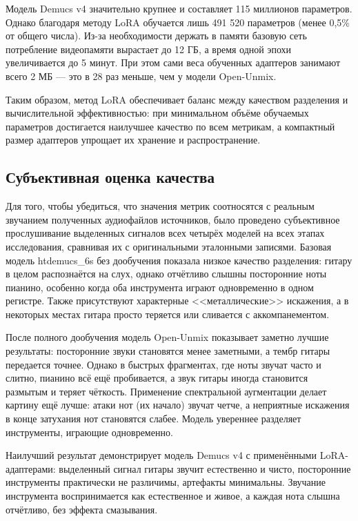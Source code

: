 \documentclass[14pt]{extarticle}
\begin{document}
Модель Demucs v4 значительно крупнее и составляет 115 миллионов параметров. Однако благодаря методу LoRA обучается лишь 
491 520 параметров (менее 0,5\% от общего числа). Из-за необходимости держать в памяти базовую сеть потребление видеопамяти 
вырастает до 12 ГБ, а время одной эпохи увеличивается до 5 минут. При этом сами веса обученных адаптеров занимают всего 2 МБ --- 
это в 28 раз меньше, чем у модели Open-Unmix.

Таким образом, метод LoRA обеспечивает баланс между качеством разделения и вычислительной эффективностью: при 
минимальном объёме обучаемых параметров достигается наилучшее качество по всем метрикам, а компактный размер адаптеров 
упрощает их хранение и распространение.

\subsection{Субъективная оценка качества}

Для того, чтобы убедиться, что значения метрик соотносятся с реальным звучанием полученных аудиофайлов источников, 
было проведено субъективное прослушивание выделенных сигналов всех четырёх моделей на всех 
этапах исследования, сравнивая их с оригинальными эталонными записями. 
Базовая модель htdemucs\_6s без дообучения показала низкое качество разделения: гитару в целом распознаётся 
на слух, однако отчётливо слышны посторонние ноты пианино, особенно когда оба инструмента играют одновременно в одном регистре. 
Также присутствуют характерные <<металлические>> искажения, а в некоторых местах гитара просто теряется или сливается с аккомпанементом.

После полного дообучения модель Open-Unmix показывает заметно лучшие результаты: посторонние звуки становятся менее 
заметными, а тембр гитары передается точнее. Однако в быстрых фрагментах, где ноты звучат часто и слитно, 
пианино всё ещё пробивается, а звук гитары иногда становится размытым и теряет чёткость. 
Применение спектральной аугментации делает картину ещё лучше: атаки нот (их начало) звучат четче, 
а неприятные искажения в конце затухания нот становятся слабее. Модель увереннее разделяет инструменты, играющие одновременно.

Наилучший результат демонстрирует модель Demucs v4 с применёнными LoRA-адаптерами: выделенный сигнал гитары звучит естественно и чисто, 
посторонние инструменты практически не различимы, артефакты минимальны. 
Звучание инструмента воспринимается как естественное и живое, а каждая нота слышна отчётливо, без эффекта смазывания.
\end{document}
